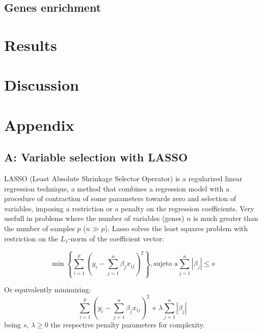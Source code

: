 \documentclass[conference]{IEEEtran}
\newcommand{\abs}[1]{\left\vert#1\right\vert}
\begin{document}

\subsection{Genes enrichment}

\section{Results}

\section{Discussion}





\newpage
\section*{Appendix}
\subsection{A: Variable selection with LASSO}
LASSO (Least Absolute Shrinkage Selector Operator) is a regularized linear regression technique, a method that combines a regression model with a procedure of contraction of some parameters towards zero and selection of variables, imposing a restriction or a penalty on the regression coefficients. Very usefull in problems where the number of variables (genes) $ n $ is much greater than the number of samples $ p $ ($ n \gg p $). Lasso solves the least squares problem with restriction on the $ L_1$-norm of the coefficient vector:

\begin{equation}
\min \left\lbrace\sum_{i=1}^{p}{\left( y_i-\sum_{j=1}^n{\beta_j x_{ij}}\right)^2} \right\rbrace , \textrm{sujeto a} \sum_{j=1}^n\abs{\beta_j}\leq s
\end{equation}

Or equivalently minimizing:
\begin{equation}
\sum_{i=1}^{p}{\left( y_i-\sum_{j=1}^n{\beta_j x_{ij}}\right)^2} + \lambda \sum_{j=1}^n\abs{\beta_j}
\end{equation}
being $ s $, $ \lambda \geq 0 $ the respective penalty parameters for complexity.\\
\end{document}
